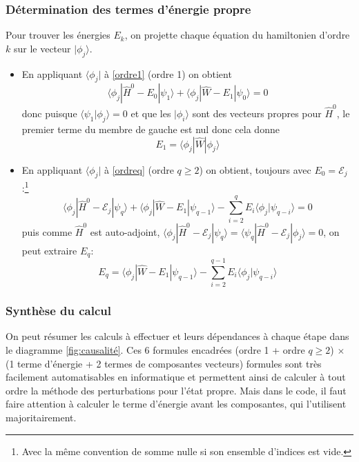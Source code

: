 \documentclass[svgnames,dvipsnames,a4paper,10pt,french]{report}
\begin{document}
\subsubsection{Détermination des termes d'énergie propre}
Pour trouver les énergies $E_k$, on projette chaque équation du hamiltonien d'ordre $k$ sur le vecteur $|\phi_j\rangle$.
\begin{itemize}
    \item En appliquant $\langle \phi_j| $ à \ref{ordre1} (ordre 1) on obtient
    \begin{equation}
        \langle \phi_j| \hat{H}^0-E_0| \psi_1\rangle + \langle \phi_j | \hat{W}-E_1|\psi_0 \rangle = 0
    \end{equation}
    donc puisque $\langle\psi_1 | \phi_j\rangle = 0$ et que les $|\phi_i\rangle$ sont des vecteurs propres pour $\hat{H}^0$, le premier terme du membre de gauche est nul donc cela donne
    \begin{equation}
        \label{en_E1}
        \boxed{E_1 = \langle \phi_j | \hat{W} | \phi_j \rangle}
    \end{equation}
    \item En appliquant $\langle \phi_j| $ à \ref{ordreq} (ordre $q\ge 2$) on obtient, toujours avec $E_0=\mathcal{E}_j$:\footnote{Avec la même convention de somme nulle si son ensemble d'indices est vide.}
    \begin{equation}
        \langle \phi_j| \hat{H}^0-\mathcal{E}_j| \psi_q \rangle + \langle \phi_j | \hat{W}-E_1|\psi_{q-1} \rangle  - \sum_{i=2}^q E_i \langle \phi_j | \psi_{q-i} \rangle = 0
    \end{equation}
    puis comme $\hat{H}^0$ est auto-adjoint, $\langle \phi_j| \hat{H}^0-\mathcal{E}_j| \psi_q \rangle = \langle \psi_q | \hat{H}^0-\mathcal{E}_j|\phi_j  \rangle = 0$, on peut extraire $E_q$:
    \begin{equation}
    \label{enqnj}
        \boxed{E_q =  \langle \phi_j | \hat{W}-E_1 | \psi_{q-1}\rangle - \sum_{i=2}^{q-1} E_i \langle \phi_j | \psi_{q-i}\rangle}
    \end{equation}
\end{itemize}

\subsubsection{Synthèse du calcul}
On peut résumer les calculs à effectuer et leurs dépendances à chaque étape dans le diagramme \ref{fig:causalité}. Ces  6 formules encadrées (ordre 1 + ordre $q\ge 2$) $\times$ (1 terme d'énergie + 2 termes de composantes vecteurs) formules sont très facilement automatisables en informatique et permettent ainsi  de calculer à tout ordre la méthode des perturbations pour l'état propre. Mais dans le code, il faut faire attention à calculer le terme d'énergie avant les composantes, qui l'utilisent majoritairement.
\end{document}
